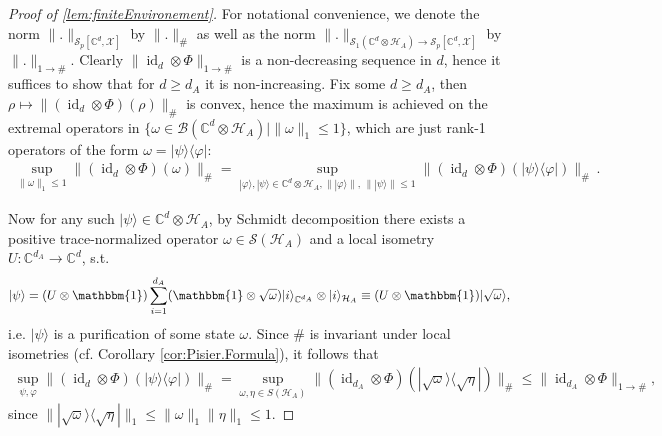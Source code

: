 \documentclass[11pt]{article}
\DeclareMathOperator{\id}{id}
\newcommand{\1}{\ensuremath{\mathbbm{1}}}
\theoremstyle{newdefinition}
\theoremstyle{newplain}
\theoremstyle{myplain}
\begin{document}
\begin{proof}[Proof of \cref{lem:finiteEnvironement}]
For notational convenience, we denote the norm $\|.\|_{\mathcal{S}_p[\mathbb{C}^d,\mathcal{X}]}$ by $\|.\|_{\#}$ as well as the norm $\|.\|_{\mathcal{S}_1(\mathbb{C}^d\otimes \mathcal{H}_A)\to \mathcal{S}_p[\mathbb{C}^d,\mathcal{X}]}$ by $\|.\|_{1\to \#}$. Clearly $\|\id_d\otimes \Phi\|_{1\to \#}$ is a non-decreasing sequence in $d$, hence it suffices to show that for $d\geq d_A$ it is non-increasing. Fix some $d\geq d_A$, then $\rho\mapsto\|(\id_d\otimes \Phi)(\rho)\|_{\#}$ is convex, hence the maximum is achieved on the extremal operators in $\{\omega\in\mathcal{B}(\mathbb{C}^d\otimes \mathcal{H}_A)|\|\omega\|_1\leq 1\}$, which are just rank-1 operators of the form $\omega=|\psi\rangle\langle\varphi|$: 
\begin{align}
   \sup_{\|\omega\|_1\le 1} \|(\id_d\otimes \Phi)(\omega)\|_{\#} = \sup_{|\varphi\rangle,|\psi\rangle\in\mathbb{C}^d\otimes\mathcal{H}_A, \||\varphi\rangle\|,\,\||\psi\rangle\|\leq 1} \|(\id_d\otimes \Phi)(|\psi\rangle\langle\varphi|)\|_{\#}\,.
\end{align}

Now for any such $|\psi\rangle\in\mathbb{C}^d\otimes\mathcal{H}_A$, by Schmidt decomposition there exists a positive trace-normalized operator $\omega\in\mathcal{S}(\mathcal{H}_A)$ and a local isometry $U:\mathbb{C}^{d_A}\to \mathbb{C}^d$, s.t. 
\begin{align}
    |\psi\rangle=(U\otimes\1)\sum_{i=1}^{d_A}(\1\otimes\sqrt{\omega})|i\rangle_{\mathbb{C}^{d_A}}\otimes|i\rangle_{\mathcal{H}_A} \equiv (U\otimes\1)|\sqrt{\omega}\rangle,
\end{align} i.e. $|\psi\rangle$ is a purification of some state $\omega$.  Since $\#$ is invariant under local isometries (cf. Corollary \ref{cor:Pisier.Formula}), it follows that
\begin{align}
    \sup_{\psi,\varphi} \|(\id_d\otimes\Phi)(|\psi\rangle\langle\varphi|)\|_{\#}=\sup_{\omega,\eta\in S(\mathcal{H}_A)}\|(\id_{d_A}\otimes\Phi)(|\sqrt{\omega}\rangle\langle\sqrt{\eta}|)\|_\# \leq \|\id_{d_A}\otimes\Phi\|_{1\to \#},
\end{align} since $\||\sqrt{\omega}\rangle\langle\sqrt{\eta}|\|_1\le\|\omega\|_1\|\eta\|_1\le 1$.
\end{proof}
\end{document}
